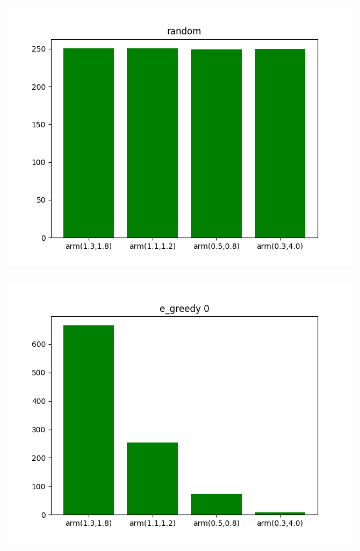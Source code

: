 \documentclass[letterpaper]{article}
\begin{document}
\begin{figure}[H]
  \begin{subfigure}{.5\textwidth}
    \centering
    \includegraphics[width=1\linewidth]{images/assign3/ex2/arms_random}
    \caption{}
    \label{fig:arms_random_ex2}
  \end{subfigure}
  \begin{subfigure}{.5\textwidth}
    \centering
    \includegraphics[width=1\linewidth]{images/assign3/ex2/arms_e_greedy0}
    \caption{}
    \label{fig:arms_e_greedy0_ex2}
  \end{subfigure}
  \begin{subfigure}{.5\textwidth}
    \centering

\end{subfigure}
\end{figure}
\end{document}
